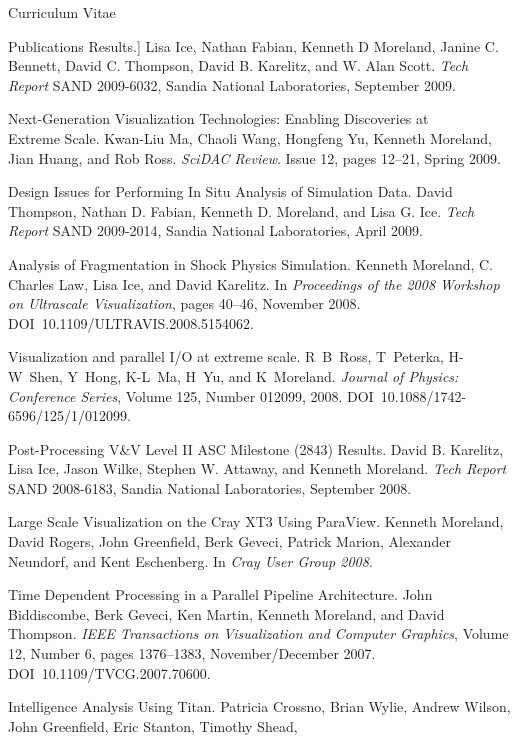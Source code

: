 \documentclass{article}
\begin{document}
\begin{cv}{Curriculum Vitae}
\begin{cvlist}{Publications}
      Results.] Lisa Ice, Nathan Fabian, Kenneth D Moreland, Janine
      C. Bennett, David C. Thompson, David B. Karelitz, and W. Alan
      Scott. \emph{Tech Report} SAND 2009-6032, Sandia National
      Laboratories, September 2009.
    \item[Next-Generation Visualization Technologies: Enabling Discoveries
      at]~\\ Extreme Scale. Kwan-Liu Ma, Chaoli Wang, Hongfeng Yu, Kenneth
      Moreland, Jian Huang, and Rob Ross. \emph{SciDAC Review}. Issue 12,
      pages 12--21, Spring 2009.
    \item[Design Issues for Performing In Situ Analysis of Simulation
      Data.] David Thompson, Nathan D. Fabian, Kenneth D. Moreland, and
      Lisa G. Ice. \emph{Tech Report} SAND 2009-2014, Sandia National
      Laboratories, April 2009.
    \item[Analysis of Fragmentation in Shock Physics Simulation.] Kenneth
      Moreland, C. Charles Law, Lisa Ice, and David Karelitz. In
      \emph{Proceedings of the 2008 Workshop on Ultrascale Visualization},
      pages 40--46, November 2008. DOI~10.1109/ULTRAVIS.2008.5154062.
    \item[Visualization and parallel I/O at extreme scale.] R~B~Ross,
      T~Peterka, H-W~Shen, Y~Hong, K-L~Ma, H~Yu, and
      K~Moreland. \emph{Journal of Physics: Conference Series}, Volume 125,
      Number 012099, 2008. DOI~10.1088/1742-6596/125/1/012099.
    \item[Post-Processing V\&V Level II ASC Milestone (2843) Results.] David
      B. Karelitz, Lisa Ice, Jason Wilke, Stephen W. Attaway, and Kenneth
      Moreland. \emph{Tech Report} SAND 2008-6183, Sandia National
      Laboratories, September 2008.
    \item[Large Scale Visualization on the Cray XT3 Using ParaView.]
      Kenneth Moreland, David Rogers, John Greenfield, Berk Geveci, Patrick
      Marion, Alexander Neundorf, and Kent Eschenberg. In \emph{Cray User
        Group 2008}.
    \item[Time Dependent Processing in a Parallel Pipeline Architecture.]
      John Biddiscombe, Berk Geveci, Ken Martin, Kenneth Moreland, and
      David Thompson.  \emph{IEEE Transactions on Visualization and
        Computer Graphics}, Volume 12, Number 6, pages 1376--1383,
      November/December 2007.  DOI~10.1109/TVCG.2007.70600.
    \item[Intelligence Analysis Using Titan.] Patricia Crossno, Brian
      Wylie, Andrew Wilson, John Greenfield, Eric Stanton, Timothy Shead,

\end{cvlist}
\end{cv}
\end{document}
